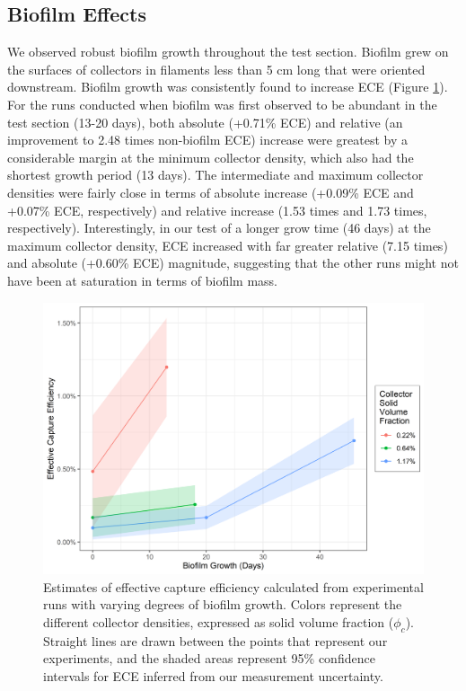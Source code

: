 \documentclass[geosciences,article,submit,moreauthors,pdftex]{Definitions/mdpi}
\begin{document}
\subsection{Biofilm Effects}

We observed robust biofilm growth throughout the test section. Biofilm grew on the surfaces of collectors in filaments less than 5 cm long that were oriented downstream. Biofilm growth was consistently found to increase ECE (Figure \ref{fig:biofilm}). For the runs conducted when biofilm was first observed to be abundant in the test section (13-20 days), both absolute (+0.71\% ECE) and relative (an improvement to 2.48 times non-biofilm ECE) increase were greatest by a considerable margin at the minimum collector density, which also had the shortest growth period (13 days). The intermediate and maximum collector densities were fairly close in terms of absolute increase (+0.09\% ECE and +0.07\% ECE, respectively) and relative increase (1.53 times and 1.73 times, respectively). Interestingly, in our test of a longer grow time (46 days) at the maximum collector density, ECE increased with far greater relative (7.15 times) and absolute (+0.60\% ECE) magnitude, suggesting that the other runs might not have been at saturation in terms of biofilm mass.

\begin{figure}[ht]
\centering
\includegraphics[width=5in]{../pics/biofilm.png}
\caption{Estimates of effective capture efficiency calculated from experimental runs with varying degrees of biofilm growth. Colors represent the different collector densities, expressed as solid volume fraction ($\phi_c$). Straight lines are drawn between the points that represent our experiments, and the shaded areas represent 95\% confidence intervals for ECE inferred from our measurement uncertainty.}
\label{fig:biofilm}
\end{figure}   
\end{document}
